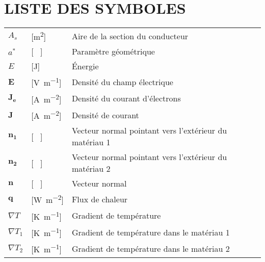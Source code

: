\chapter*{LISTE DES SYMBOLES}
\pagestyle{pagenumber}
%

%
\begin{longtable}{l p{2.5cm} p{4in}}
	$A_s$            & [\si{\square\metre}]                                & Aire de la section du conducteur                             \\
	$a^*$            & [ \ ]                                               & Paramètre géométrique                                        \\
	$E$              & [\si{\joule}]                                       & Énergie                                                      \\
	$\mathbf{E}$     & [\si{\volt\per\metre}]                              & Densité du champ électrique                                 \\
	$\mathbf{J_e}$   & [\si{\ampere\per\square\metre}]                     & Densité du courant d'électrons                               \\
	$\mathbf{J}$     & [\si{\ampere\per\square\metre}]                     & Densité de courant                                           \\
	$\mathbf{n_1}$   & [ \ ]                                               & Vecteur normal pointant vers l'extérieur du matériau 1       \\
	$\mathbf{n_2}$   & [ \ ]                                               & Vecteur normal pointant vers l'extérieur du matériau 2       \\
	$\mathbf{n}$     & [ \ ]                                               & Vecteur normal                                               \\
	$\mathbf{q}$     & [\si{\watt\per\square\metre}]                       & Flux de chaleur                                              \\
	$\nabla T$       & [\si{\kelvin\per\metre}]                            & Gradient de température                                      \\
	$\nabla T_1$     & [\si{\kelvin\per\metre}]                            & Gradient de température dans le matériau 1                   \\
	$\nabla T_2$     & [\si{\kelvin\per\metre}]                            & Gradient de température dans le matériau 2                   \\

\end{longtable}
